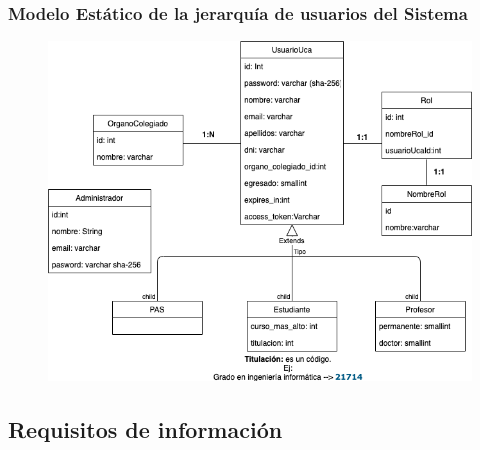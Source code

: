 \documentclass[12pt,letterpaper]{report}
\begin{document}
		\subsubsection{Modelo Estático de la jerarquía de usuarios del Sistema}
			\begin{figure}[htp]
				\centering
				\includegraphics[width=0.9\linewidth]{img/MEJerarquiaUsuarios}
				\caption{}
				\label{fig:meprocesoselectorales}
			\end{figure}
		\newpage	
	\subsection{Requisitos de información}
\end{document}

